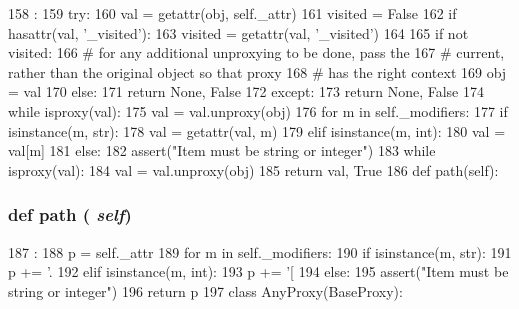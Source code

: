 \begin{DoxyCode}
158                        :
159         try:
160             val = getattr(obj, self._attr)
161             visited = False
162             if hasattr(val, '_visited'):
163                 visited = getattr(val, '_visited')
164 
165             if not visited:
166                 # for any additional unproxying to be done, pass the
167                 # current, rather than the original object so that proxy
168                 # has the right context
169                 obj = val
170             else:
171                 return None, False
172         except:
173             return None, False
174         while isproxy(val):
175             val = val.unproxy(obj)
176         for m in self._modifiers:
177             if isinstance(m, str):
178                 val = getattr(val, m)
179             elif isinstance(m, int):
180                 val = val[m]
181             else:
182                 assert("Item must be string or integer")
183             while isproxy(val):
184                 val = val.unproxy(obj)
185         return val, True
186 
    def path(self):
\end{DoxyCode}
\hypertarget{classm5_1_1proxy_1_1AttrProxy_a4767b0796ffc0da267b28b3f24776d97}{
\subsubsection[{path}]{\setlength{\rightskip}{0pt plus 5cm}def path ( {\em self})}}
\label{classm5_1_1proxy_1_1AttrProxy_a4767b0796ffc0da267b28b3f24776d97}



\begin{DoxyCode}
187                   :
188         p = self._attr
189         for m in self._modifiers:
190             if isinstance(m, str):
191                 p += '.%
192             elif isinstance(m, int):
193                 p += '[%
194             else:
195                 assert("Item must be string or integer")
196         return p
197 
class AnyProxy(BaseProxy):
\end{DoxyCode}


